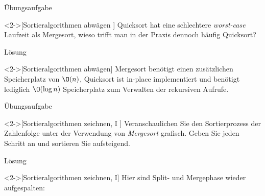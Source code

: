 \ifull
\begin{frame}[c]{Übungsaufgabe}
    \begin{exercise}<2->[Sortieralgorithmen abwägen ]
        Quicksort hat eine schlechtere \emph{worst-case} Laufzeit als Mergesort, wieso trifft man in der Praxis dennoch häufig Quicksort?
    \end{exercise}
\end{frame}

\begin{frame}[c]{Lösung}
    \begin{solve}<2->[Sortieralgorithmen abwägen]
        \pause{}Mergesort benötigt einen zusätzlichen Speicherplatz von \(\O(n)\), Quicksort ist in-place implementiert und benötigt lediglich \(\O(\log n)\) Speicherplatz zum Verwalten der rekursiven Aufrufe.
    \end{solve}
\end{frame}

\begin{frame}[c]{Übungsaufgabe}
    \begin{exercise}<2->[Sortieralgorithmen zeichnen, I ]
        \pause{}Veranschaulichen Sie den Sortierprozess der Zahlenfolge  unter der Verwendung von \emph{Mergesort} grafisch. Geben Sie jeden Schritt an und sortieren Sie aufsteigend.
    \end{exercise}
\end{frame}

\begin{frame}[c]{Lösung}
    \begin{solve}<2->[Sortieralgorithmen zeichnen, I]
        \pause{}Hier sind Split- und Mergephase wieder aufgespalten:\pause{}
\begin{center}
    \qquad~~\qquad\pause{}
\end{center}
    \end{solve}
\end{frame}

